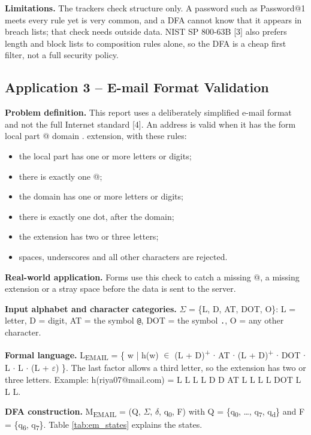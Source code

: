 \documentclass[12pt,a4paper]{article}
\begin{document}
\textbf{Limitations.} The trackers check structure only. A password such as Password@1 meets every rule yet is very common, and a DFA cannot know that it appears in breach lists; that check needs outside data. NIST SP 800-63B [3] also prefers length and block lists to composition rules alone, so the DFA is a cheap first filter, not a full security policy.

\subsection{Application 3 -- E-mail Format Validation}

\textbf{Problem definition.} This report uses a deliberately simplified e-mail format and not the full Internet standard [4]. An address is valid when it has the form local part @ domain . extension, with these rules:

\begin{itemize}
\item the local part has one or more letters or digits;
\item there is exactly one @;
\item the domain has one or more letters or digits;
\item there is exactly one dot, after the domain;
\item the extension has two or three letters;
\item spaces, underscores and all other characters are rejected.
\end{itemize}

\textbf{Real-world application.} Forms use this check to catch a missing @, a missing extension or a stray space before the data is sent to the server.

\textbf{Input alphabet and character categories.} \ensuremath{\Sigma} = \{L, D, AT, DOT, O\}: L = letter, D = digit, AT = the symbol \texttt{@}, DOT = the symbol \texttt{.}, O = any other character.

\textbf{Formal language.} L\textsubscript{EMAIL} = \{ w | h(w) \ensuremath{\in} (L + D)\textsuperscript{+} \ensuremath{\cdot} AT \ensuremath{\cdot} (L + D)\textsuperscript{+} \ensuremath{\cdot} DOT \ensuremath{\cdot} L \ensuremath{\cdot} L \ensuremath{\cdot} (L + \ensuremath{\varepsilon}) \}. The last factor allows a third letter, so the extension has two or three letters. Example: h(riya07@mail.com) = L L L L D D AT L L L L DOT L L L.

\textbf{DFA construction.} M\textsubscript{EMAIL} = (Q, \ensuremath{\Sigma}, \ensuremath{\delta}, q\textsubscript{0}, F) with Q = \{q\textsubscript{0}, \ldots{}, q\textsubscript{7}, q\textsubscript{d}\} and F = \{q\textsubscript{6}, q\textsubscript{7}\}. Table \ref{tab:em_states} explains the states.
\end{document}
